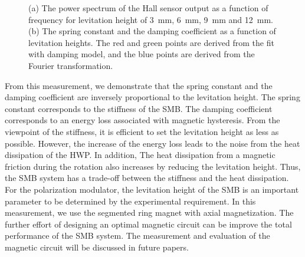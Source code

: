 \documentclass[a4paper,11pt]{jpconf}
\begin{document}
\begin{figure}[htbp]
  \centering
  \begin{minipage}{0.45\hsize}
  \end{minipage}
  \begin{minipage}{0.45\hsize}
    \centering
  \end{minipage}
  \caption{(a) The power spectrum of the Hall sensor output as a function of frequency for levitation height of 3~mm, 6~mm, 9~mm and 12~mm.
    (b) The spring constant and the damping coefficient as a function of levitation heights.
    The red and green points are derived from the fit with damping model, and the blue points are derived from the Fourier transformation.}
  \label{fig:fft}
\end{figure}

From this measurement, we demonstrate that the spring constant and the damping coefficient are inversely proportional to the levitation height.
The spring constant corresponds to the stiffness of the SMB.
The damping coefficient corresponds to an energy loss associated with magnetic hysteresis.
From the viewpoint of the stiffness, it is efficient to set the levitation height as less as possible.
However, the increase of the energy loss leads to the noise from the heat dissipation of the HWP.
In addition, The heat dissipation from a magnetic friction during the rotation also increases by reducing the levitation height.
Thus, the SMB system has a trade-off between the stiffness and the heat dissipation.
For the polarization modulator, the levitation height of the SMB is an important parameter to be determined by the experimental requirement.
In this measurement, we use the segmented ring magnet with axial magnetization.
The further effort of designing an optimal magnetic circuit can be improve the total performance of the SMB system.
The measurement and evaluation of the magnetic circuit will be discussed in future papers.
\end{document}
